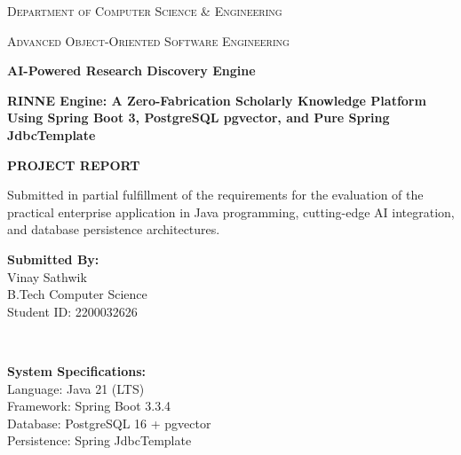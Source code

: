 \documentclass[11pt,a4paper,titlepage]{report}
\begin{document}
\begin{titlepage}
    \centering
    \vspace*{0.5cm}
    
    {\scshape\Large Department of Computer Science \& Engineering \par}
    {\scshape\large Advanced Object-Oriented Software Engineering \par}
    
    \vspace{1.5cm}
    \begin{tcolorbox}[colback=primaryTeal!8!white, colframe=primaryTeal, boxrule=1.5pt, arc=4pt]
        \centering\vspace{8pt}
        {\Huge\bfseries\color{primaryTeal} AI-Powered Research Discovery Engine \par}
        \vspace{10pt}
        {\large\bfseries\color{darkSlate} RINNE Engine: A Zero-Fabrication Scholarly Knowledge Platform Using Spring Boot 3, PostgreSQL pgvector, and Pure Spring JdbcTemplate \par}
        \vspace{8pt}
    \end{tcolorbox}
    
    \vspace{1.5cm}
    {\large\textbf{PROJECT REPORT}\par}
    \vspace{0.3cm}
    {\normalsize Submitted in partial fulfillment of the requirements for the evaluation of the practical enterprise application in Java programming, cutting-edge AI integration, and database persistence architectures.\par}
    
    \vfill
    
    \begin{minipage}{0.45\textwidth}
        \begin{flushleft} \large
            \textbf{Submitted By:}\\
            Vinay Sathwik\\
            B.Tech Computer Science\\
            Student ID: 2200032626
        \end{flushleft}
    \end{minipage}
    ~
    \begin{minipage}{0.45\textwidth}
        \begin{flushright} \large
            \textbf{System Specifications:}\\
            Language: Java 21 (LTS)\\
            Framework: Spring Boot 3.3.4\\
            Database: PostgreSQL 16 + pgvector\\
            Persistence: Spring JdbcTemplate
        \end{flushright}
    \end{minipage}
    

\end{titlepage}
\end{document}
